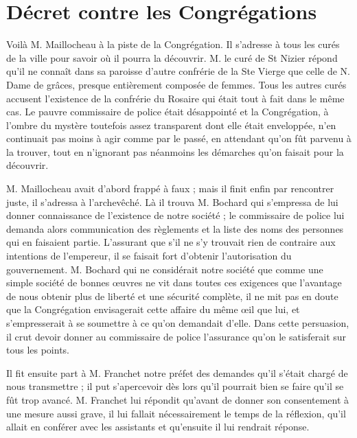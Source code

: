 \section*{Décret contre les Congrégations}
Voilà M. Maillocheau à la piste de la Congrégation. Il s'adresse à tous les curés de la ville pour savoir où il pourra la découvrir. M. le curé de St Nizier répond qu'il ne connaît dans sa paroisse d'autre confrérie de la Ste Vierge que celle de N. Dame de grâces, presque entièrement composée de femmes. Tous les autres curés accusent l'existence de la confrérie du Rosaire qui était tout à fait dans le même cas. Le pauvre commissaire de police était désappointé et la Congrégation, à l'ombre du mystère toutefois assez transparent dont elle était enveloppée, n'en continuait pas moins à agir comme par le passé, en attendant qu'on fût parvenu à la trouver, tout en n'ignorant pas néanmoins les démarches qu'on faisait pour la découvrir.

M. Maillocheau avait d'abord frappé à faux ; mais il
finit enfin par rencontrer juste, il s'adressa à l'archevêché. Là il trouva M. Bochard qui s'empressa de lui donner connaissance de l'existence de notre société ; le commissaire de police lui demanda alors communication des règlements et la liste des noms des personnes qui en faisaient partie. L'assurant que s'il ne s'y trouvait rien de contraire aux intentions de l'empereur, il se faisait fort d'obtenir l'autorisation du gouvernement. M. Bochard qui ne considérait notre société que comme une simple société de bonnes œuvres ne vit dans toutes ces exigences que l'avantage de nous obtenir plus de liberté et une sécurité complète, il ne mit pas en doute que la Congrégation envisagerait cette affaire du même œil que lui, et s'empresserait à se soumettre à ce qu'on demandait d'elle. Dans cette persuasion, il crut devoir donner au commissaire de police l'assurance qu'on le satisferait sur tous les points.

Il fit ensuite part à M. Franchet notre préfet des demandes qu'il s'était chargé de nous transmettre ; il put s'apercevoir dès lors qu'il pourrait bien se faire qu'il se fût trop avancé. M. Franchet lui répondit qu'avant de donner son consentement à une mesure aussi grave, il lui fallait nécessairement le temps de la réflexion, qu'il allait en conférer avec les assistants et qu'ensuite il lui rendrait réponse.


